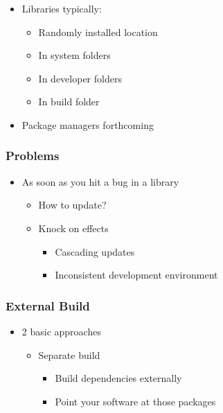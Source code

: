 \begin{itemize}
\itemsep1pt\parskip0pt
\item
  Libraries typically:

  \begin{itemize}
  \itemsep1pt\parskip0pt
  \item
    Randomly installed location
  \item
    In system folders
  \item
    In developer folders
  \item
    In build folder
  \end{itemize}
\item
  Package managers forthcoming
\end{itemize}

\subsubsection{Problems}\label{problems}

\begin{itemize}
\itemsep1pt\parskip0pt
\item
  As soon as you hit a bug in a library

  \begin{itemize}
  \itemsep1pt\parskip0pt
  \item
    How to update?
  \item
    Knock on effects

    \begin{itemize}
    \itemsep1pt\parskip0pt
    \item
      Cascading updates
    \item
      Inconsistent development environment
    \end{itemize}
  \end{itemize}
\end{itemize}

\subsubsection{External Build}\label{external-build}

\begin{itemize}
\itemsep1pt\parskip0pt
\item
  2 basic approaches

  \begin{itemize}
  \itemsep1pt\parskip0pt
  \item
    Separate build

    \begin{itemize}
    \itemsep1pt\parskip0pt
    \item
      Build dependencies externally
    \item
      Point your software at those packages
    \end{itemize}
  \end{itemize}
\end{itemize}

